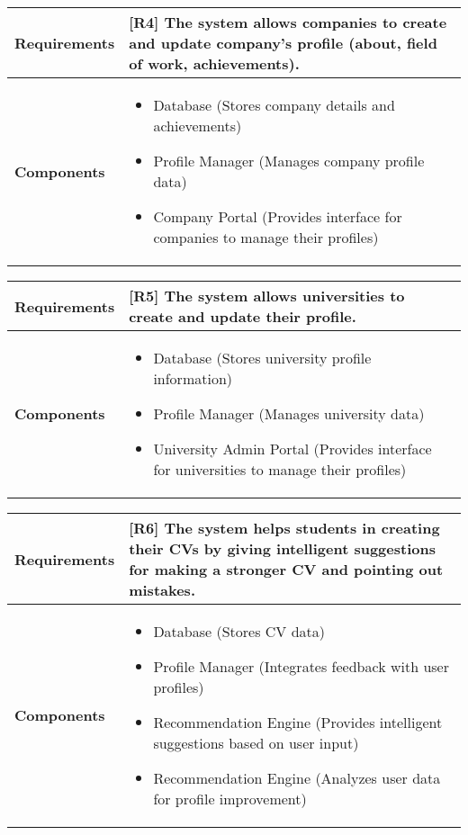 \begin{table}[h!]
\centering
\begin{tabular}{|l|p{10cm}|}
\hline
\textbf{Requirements} & 
[R4] The system allows companies to create and update company’s profile (about, field of work, achievements).\\
\hline
\textbf{Components} & 
\begin{itemize}
    \item Database (Stores company details and achievements)
    \item Profile Manager (Manages company profile data)
    \item Company Portal (Provides interface for companies to manage their profiles)
\end{itemize} \\
\hline
\end{tabular}
\label{tab:req_comp}
\end{table}

\begin{table}[h!]
\centering
\begin{tabular}{|l|p{10cm}|}
\hline
\textbf{Requirements} & 
[R5] The system allows universities to create and update their profile.\\
\hline
\textbf{Components} & 
\begin{itemize}
    \item Database (Stores university profile information)
    \item Profile Manager (Manages university data)
    \item University Admin Portal (Provides interface for universities to manage their profiles)
\end{itemize} \\
\hline
\end{tabular}
\label{tab:req_comp}
\end{table}

\begin{table}[h!]
\centering
\begin{tabular}{|l|p{10cm}|}
\hline
\textbf{Requirements} & 
[R6] The system helps students in creating their CVs by giving intelligent suggestions for making a stronger CV and pointing out mistakes.\\
\hline
\textbf{Components} & 
\begin{itemize}
    \item Database (Stores CV data)
    \item Profile Manager (Integrates feedback with user profiles)
    \item Recommendation Engine (Provides intelligent suggestions based on user input)
    \item Recommendation Engine (Analyzes user data for profile improvement)
\end{itemize} \\
\hline
\end{tabular}
\label{tab:req_comp}
\end{table}

